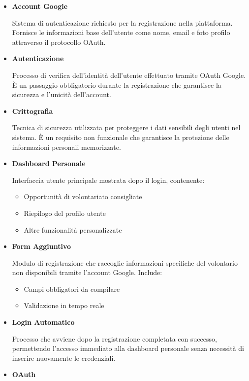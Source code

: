 \begin{itemize}

\item \textbf{Account Google}

Sistema di autenticazione richiesto per la registrazione nella piattaforma. Fornisce le informazioni base dell'utente come nome, email e foto profilo attraverso il protocollo OAuth.

\item \textbf{Autenticazione}

Processo di verifica dell'identità dell'utente effettuato tramite OAuth Google. È un passaggio obbligatorio durante la registrazione che garantisce la sicurezza e l'unicità dell'account.

\item \textbf{Crittografia}

Tecnica di sicurezza utilizzata per proteggere i dati sensibili degli utenti nel sistema. È un requisito non funzionale che garantisce la protezione delle informazioni personali memorizzate.

\item \textbf{Dashboard Personale}

Interfaccia utente principale mostrata dopo il login, contenente:
\begin{itemize}
    \item Opportunità di volontariato consigliate
    \item Riepilogo del profilo utente
    \item Altre funzionalità personalizzate
\end{itemize}

\item \textbf{Form Aggiuntivo}

Modulo di registrazione che raccoglie informazioni specifiche del volontario non disponibili tramite l'account Google. Include:
\begin{itemize}
    \item Campi obbligatori da compilare
    \item Validazione in tempo reale
\end{itemize}

\item \textbf{Login Automatico}

Processo che avviene dopo la registrazione completata con successo, permettendo l'accesso immediato alla dashboard personale senza necessità di inserire nuovamente le credenziali.

\item \textbf{OAuth}


\end{itemize}
